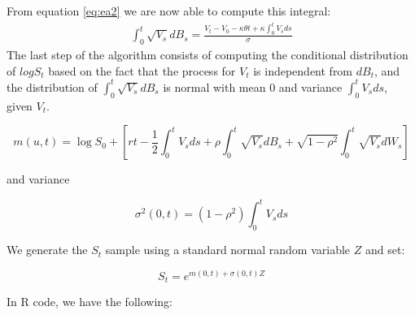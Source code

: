 \documentclass[12pt,oneside]{reedthesis}
\theoremstyle{definition}
\theoremstyle{definition}
\theoremstyle{remark}
\begin{document}
  From equation \eqref{eq:ea2} we are now able to compute this integral:
  \begin{align} \label{eq:ea3}
  \int_{0}^{t}{\sqrt{V_s} dB_s} = \frac{V_t - V_0 - \kappa \theta t + \kappa \int_{0}^{t}{V_s ds}}{\sigma} 
  \end{align}
  The last step of the algorithm consists of computing the conditional
  distribution of \(log S_t\) based on the fact that the process for
  \(V_t\) is independent from \(dB_t\), and the distribution of
  \(\displaystyle \int_0^t{\sqrt{V_s} dB_s}\) is normal with mean \(0\)
  and variance \(\displaystyle \int_0^t{V_s ds}\), given \(V_t\).
  
  \[m(u,t) = \log S_0 + \left[ r t - \frac{1}{2} \int_{0}^{t}{V_s ds} + \rho  \int_{0}^{t}{\sqrt{V_s} d B_s} + \sqrt{1 - \rho^2} \int_{0}^{t}{\sqrt{V_s} dW_s}\right]\]
  
  and variance
  
  \[\sigma^2(0,t) = \left( 1 - \rho^2 \right) \int_0^t{V_s ds}\]
  
  We generate the \(S_t\) sample using a standard normal random variable
  \(Z\) and set:
  
  \[S_t = e^{m(0,t) + \sigma (0,t) Z}\]
  
  In R code, we have the following:
  \begin{Shaded}
  \begin{Highlighting}[]
  \StringTok{ }\NormalTok{(}\OperatorTok{/}\OperatorTok{*}\StringTok{ }\OperatorTok{-}\StringTok{ }\OperatorTok{-}\StringTok{ }\OperatorTok{*}\StringTok{ }\OperatorTok{*}\StringTok{ }\OperatorTok{+}\StringTok{ }\OperatorTok{*}\StringTok{ }
    
  \StringTok{ }\OperatorTok{+}\StringTok{ }\OperatorTok{*}\StringTok{ }\OperatorTok{-}\StringTok{ }\OperatorTok{-}\StringTok{ }\NormalTok{(}\OperatorTok{/}\NormalTok{) }\OperatorTok{*}\StringTok{ }\OperatorTok{+}\StringTok{ }\OperatorTok{*}\StringTok{ }
  \StringTok{ }\NormalTok{((} \OperatorTok{-}\StringTok{ }\OperatorTok{^}\NormalTok{)) }\OperatorTok{*}\StringTok{ }
  \StringTok{ }\OperatorTok{+}\StringTok{ }\OperatorTok{*}\StringTok{ }\OperatorTok{::}\NormalTok{(}\NormalTok{))}
  \end{Highlighting}
  \end{Shaded}
\end{document}
